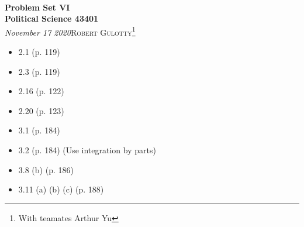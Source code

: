 \documentclass[12pt]{article}
\begin{document}
{\noindent\Huge\bf  \\[0.5\baselineskip] {\selectfont  Problem Set VI}         }\\[2\baselineskip] %
{ {\bf {}\selectfont Political Science 43401}\\ {\textit{\selectfont     November 17 2020}}}\hfill   {\large \textsc{Robert Gulotty}\footnote{With teamates Arthur Yu}} %
\\[1.4\baselineskip] 





\begin{itemize}
\item[]  2.1 (p. 119)
\item[]   2.3 (p. 119)
\item[]  2.16 (p. 122)
\item[] 2.20 (p. 123)
\item[] 3.1 (p. 184)
\item[] 3.2 (p. 184) (Use integration by parts)
\item[] 3.8 (b) (p. 186)
\item[] 3.11 (a) (b) (c) (p. 188)
\end{itemize}



 
\end{document}
